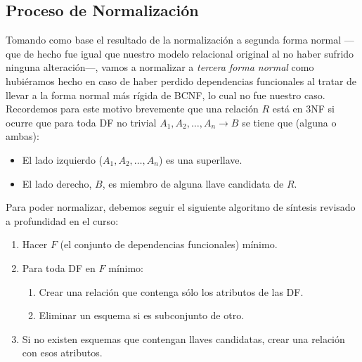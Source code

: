 \documentclass[11pt,letterpaper]{article}
\begin{document}
\subsection{Proceso de Normalización}
Tomando como base el resultado de la normalización a segunda forma normal ---que de hecho fue igual que nuestro modelo relacional original al no haber sufrido ninguna alteración---, vamos a normalizar a \textit{tercera forma normal} como hubiéramos hecho en caso de haber perdido dependencias funcionales al tratar de llevar a la forma normal más rígida de BCNF, lo cual no fue nuestro caso.\\

Recordemos para este motivo brevemente que una relación $R$ está en 3NF si ocurre que para toda DF no trivial $A_1,A_2,\dots, A_n\rightarrow B$ se tiene que (alguna o ambas):

\begin{itemize}
\item El lado izquierdo ($A_1,A_2,\dots, A_n$) es una superllave.
\item El lado derecho, $B$, es miembro de alguna llave candidata de $R$.
\end{itemize}

Para poder normalizar, debemos seguir el siguiente algoritmo de síntesis revisado a profundidad en el curso:

\begin{enumerate}
\item Hacer $F$ (el conjunto de dependencias funcionales) mínimo.
\item Para toda DF en $F$ mínimo:
\begin{enumerate}
\item Crear una relación que contenga sólo los atributos de las DF.
\item Eliminar un esquema si es subconjunto de otro.
\end{enumerate}
\item Si no existen esquemas que contengan llaves candidatas, crear una relación con esos atributos.
\end{enumerate}
\end{document}
